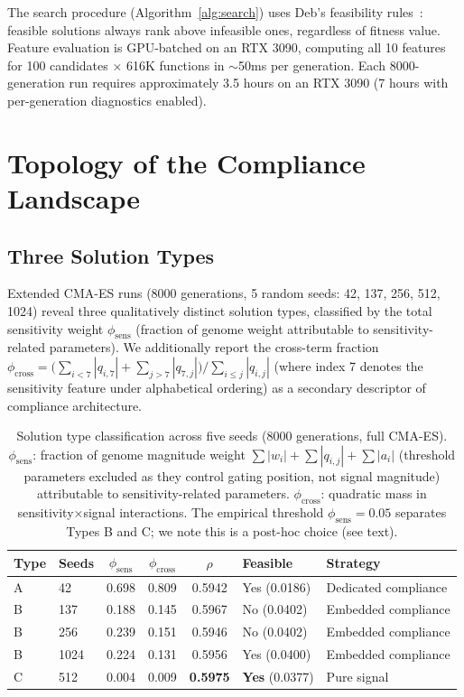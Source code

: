 \documentclass[twoside]{article}
\begin{document}
The search procedure (Algorithm~\ref{alg:search}) uses Deb's feasibility
rules~\citep{deb2000efficient}: feasible solutions always rank above infeasible
ones, regardless of fitness value. Feature evaluation is GPU-batched on an
RTX 3090, computing all 10 features for 100 candidates $\times$ 616K functions
in $\sim$50ms per generation. Each 8000-generation run requires approximately
3.5 hours on an RTX 3090 (7 hours with per-generation diagnostics enabled).

\section{Topology of the Compliance Landscape}
\label{sec:landscape}

\subsection{Three Solution Types}

Extended CMA-ES runs (8000 generations, 5 random seeds: 42, 137, 256, 512, 1024)
reveal three qualitatively distinct solution types, classified by the total
sensitivity weight $\phi_{\text{sens}}$ (fraction of genome weight attributable to
sensitivity-related parameters). We additionally report the cross-term fraction
$\phi_{\text{cross}} = \bigl(\sum_{i < 7} |q_{i,7}| + \sum_{j > 7} |q_{7,j}|\bigr) / \sum_{i \leq j} |q_{i,j}|$
(where index 7 denotes the sensitivity feature under alphabetical ordering) as a secondary descriptor of
compliance architecture.

\begin{table}[t]
\caption{Solution type classification across five seeds (8000 generations,
full CMA-ES). $\phi_{\text{sens}}$: fraction of genome magnitude weight
$\sum |w_i| + \sum |q_{i,j}| + \sum |a_i|$ (threshold parameters excluded as
they control gating position, not signal magnitude) attributable to
sensitivity-related parameters. $\phi_{\text{cross}}$: quadratic mass in sensitivity$\times$signal
interactions. The empirical threshold $\phi_{\text{sens}} = 0.05$ separates
Types B and C; we note this is a post-hoc choice (see text).}
\label{tab:types}
\centering
\begin{tabular}{llcccll}
\toprule
Type & Seeds & $\phi_{\text{sens}}$ & $\phi_{\text{cross}}$ & $\rho$ & Feasible & Strategy \\
\midrule
A & 42 & 0.698 & 0.809 & 0.5942 & Yes (0.0186) & Dedicated compliance \\
B & 137 & 0.188 & 0.145 & 0.5967 & No (0.0402) & Embedded compliance \\
B & 256 & 0.239 & 0.151 & 0.5946 & No (0.0402) & Embedded compliance \\
B & 1024 & 0.224 & 0.131 & 0.5956 & Yes (0.0400) & Embedded compliance \\
C & 512 & 0.004 & 0.009 & \textbf{0.5975} & \textbf{Yes} (0.0377) & Pure signal \\
\bottomrule
\end{tabular}
\end{table}
\end{document}
